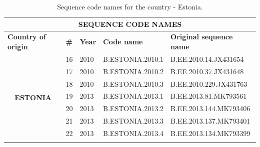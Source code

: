 \begin{table}[htbp]
 \caption{Sequence code names for the country - Estonia.}
    \centering
\begin{tabular}{|cllll|}
\hline
\multicolumn{5}{|c|}{\textbf{SEQUENCE   CODE NAMES}}                                                                                                                                                         \\ \hline
\multicolumn{1}{|l|}{\textbf{Country   of origin}}       & \multicolumn{1}{l|}{\textbf{\#}} & \multicolumn{1}{r|}{\textbf{Year}} & \multicolumn{1}{l|}{\textbf{Code name}} & \textbf{Original sequence name} \\ \hline
\multicolumn{1}{|c|}{\multirow{10}{*}{\textbf{ESTONIA}}} & \multicolumn{1}{l|}{16}          & \multicolumn{1}{l|}{2010}          & \multicolumn{1}{l|}{B.ESTONIA.2010.1}   & B.EE.2010.14.JX431654           \\ \cline{2-5} 
\multicolumn{1}{|c|}{}                                   & \multicolumn{1}{l|}{17}          & \multicolumn{1}{l|}{2010}          & \multicolumn{1}{l|}{B.ESTONIA.2010.2}   & B.EE.2010.37.JX431648           \\ \cline{2-5} 
\multicolumn{1}{|c|}{}                                   & \multicolumn{1}{l|}{18}          & \multicolumn{1}{l|}{2010}          & \multicolumn{1}{l|}{B.ESTONIA.2010.3}   & B.EE.2010.229.JX431763          \\ \cline{2-5} 
\multicolumn{1}{|c|}{}                                   & \multicolumn{1}{l|}{19}          & \multicolumn{1}{l|}{2013}          & \multicolumn{1}{l|}{B.ESTONIA.2013.1}   & B.EE.2013.81.MK793561           \\ \cline{2-5} 
\multicolumn{1}{|c|}{}                                   & \multicolumn{1}{l|}{20}          & \multicolumn{1}{l|}{2013}          & \multicolumn{1}{l|}{B.ESTONIA.2013.2}   & B.EE.2013.144.MK793406          \\ \cline{2-5} 
\multicolumn{1}{|c|}{}                                   & \multicolumn{1}{l|}{21}          & \multicolumn{1}{l|}{2013}          & \multicolumn{1}{l|}{B.ESTONIA.2013.3}   & B.EE.2013.137.MK793401          \\ \cline{2-5} 
\multicolumn{1}{|c|}{}                                   & \multicolumn{1}{l|}{22}          & \multicolumn{1}{l|}{2013}          & \multicolumn{1}{l|}{B.ESTONIA.2013.4}   & B.EE.2013.134.MK793399          \\ \cline{2-5} 

\end{tabular}
\end{table}
